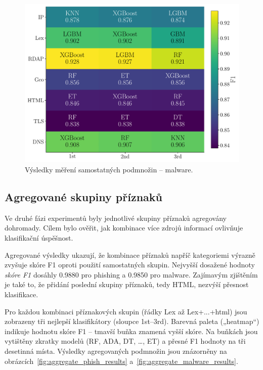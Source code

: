 \begin{figure}[!h]
    \centering
    \includegraphics[width=\textwidth]{obrazky-figures/base_malware.pdf}
    \caption{Výsledky měření samostatných podmnožin – malware.}
    \label{fig:subset_malware_results}
\end{figure}

\subsection{Agregované skupiny příznaků}
\label{subsection:agg_res}


Ve druhé fázi experimentů byly jednotlivé skupiny příznaků agregovány dohromady. Cílem bylo ověřit, jak kombinace více zdrojů informací ovlivňuje klasifikační úspěšnost.

Agregované výsledky ukazují, že kombinace příznaků napříč kategoriemi  výrazně zvyšuje skóre F1 oproti použití samostatných skupin. Nejvyšší dosažené hodnoty \textit{skóre F1} dosáhly 0.9880 pro phishing a 0.9850 pro malware. Zajímavým zjištěním je také to, že přidání poslední skupiny příznaků, tedy HTML, nezvýší přesnost klasifikace. 

Pro každou kombinaci příznakových skupin (řádky Lex až Lex+...+html) jsou zobrazeny tři nejlepší klasifikátory (sloupce 1st–3rd). Barevná paleta („heatmap“) indikuje hodnotu skóre F1 – tmavší buňka znamená vyšší skóre. Na buňkách jsou vytištěny zkratky modelů (RF, ADA, DT, …, ET) a přesné F1 hodnoty na tři desetinná místa. Výsledky agregovaných podmnožin jsou znázorněny na obrázcích~\ref{fig:aggregate_phish_results} a~\ref{fig:aggregate_malware_results}.

